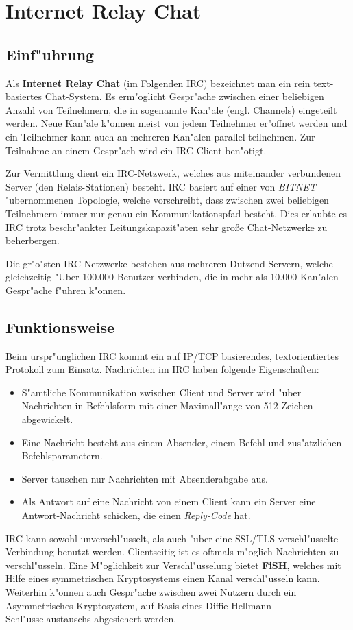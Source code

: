 
\section{Internet Relay Chat}
\subsection{Einf"uhrung}
Als \textbf{Internet Relay Chat} (im Folgenden IRC) bezeichnet man ein rein text-basiertes Chat-System. Es erm"oglicht Gespr"ache zwischen einer beliebigen Anzahl von Teilnehmern, die in sogenannte Kan"ale (engl. Channels) eingeteilt werden. Neue Kan"ale k"onnen meist von jedem Teilnehmer er"offnet werden und ein Teilnehmer kann auch an mehreren Kan"alen parallel teilnehmen. Zur Teilnahme an einem Gespr"ach wird ein IRC-Client ben"otigt. 

Zur Vermittlung dient ein IRC-Netzwerk, welches aus miteinander verbundenen Server (den Relais-Stationen) besteht. 
IRC basiert auf einer von \textit{BITNET} "ubernommenen Topologie, welche vorschreibt, dass zwischen zwei beliebigen Teilnehmern immer nur genau ein Kommunikationspfad besteht. Dies erlaubte es IRC trotz beschr"ankter Leitungskapazit"aten sehr große Chat-Netzwerke zu beherbergen.

Die gr"o"sten IRC-Netzwerke bestehen aus mehreren Dutzend Servern, welche gleichzeitig "Uber 100.000 Benutzer verbinden, die in mehr als 10.000 Kan"alen Gespr"ache f"uhren k"onnen.

\subsection{Funktionsweise}
Beim urspr"unglichen IRC kommt ein auf IP/TCP basierendes, textorientiertes Protokoll zum Einsatz.
Nachrichten im IRC haben folgende Eigenschaften:
\begin{itemize}
\item S"amtliche Kommunikation zwischen Client und Server wird "uber Nachrichten in Befehlsform mit einer Maximall"ange von 512 Zeichen abgewickelt.
\item Eine Nachricht besteht aus einem Absender, einem Befehl und zus"atzlichen Befehlsparametern.
\item Server tauschen nur Nachrichten mit Absenderabgabe aus.
\item Als Antwort auf eine Nachricht von einem Client kann ein Server eine Antwort-Nachricht schicken, die einen \textit{Reply-Code} hat. 
\end{itemize}
IRC kann sowohl unverschl"usselt, als auch "uber eine SSL/TLS-verschl"usselte Verbindung benutzt werden. Clientseitig ist es oftmals m"oglich Nachrichten zu verschl"usseln. Eine M"oglichkeit zur Verschl"usselung bietet \textbf{FiSH}, welches mit Hilfe eines symmetrischen Kryptosystems einen Kanal verschl"usseln kann. Weiterhin k"onnen auch Gespr"ache zwischen zwei Nutzern durch ein Asymmetrisches Kryptosystem, auf Basis eines Diffie-Hellmann-Schl"usselaustauschs abgesichert werden.

